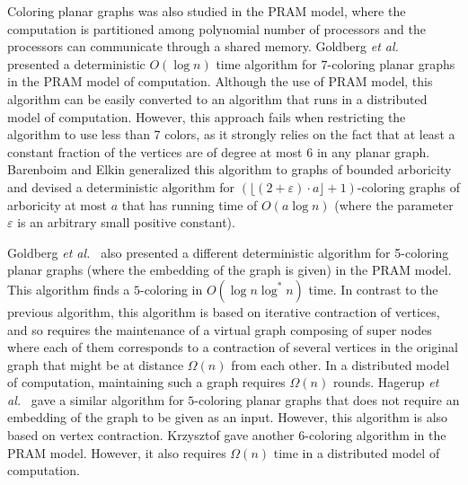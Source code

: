 \documentclass{article}
\theoremstyle{definition}
\newcommand{\etal}{{\em et al.\ }}
\begin{document}
Coloring planar graphs was also studied in the PRAM model, where the computation is partitioned among polynomial number of processors and the processors can communicate through a shared memory.
Goldberg \etal \cite{Goldberg87} presented a deterministic $O(\log{n})$ time algorithm for $7$-coloring planar graphs in the PRAM model of computation.
Although the use of PRAM model, this algorithm can be easily converted to an algorithm that runs in a distributed model of computation.
However, this approach fails when restricting the algorithm to use less than 7 colors, as it strongly relies on the fact that at least a constant fraction of the vertices are of degree at most 6 in any planar graph.
Barenboim and Elkin \cite{Barenboim08} generalized this algorithm to graphs of bounded arboricity and devised a deterministic algorithm for $\left(\lfloor (2 + \varepsilon) \cdot a \rfloor + 1\right)$-coloring graphs of arboricity at most $a$ that has running time of $O(a\log{n})$ (where the parameter $\varepsilon$ is an arbitrary small positive constant).


Goldberg \etal \cite{Goldberg87} also presented a different deterministic algorithm for 5-coloring planar graphs (where the embedding of the graph is given) in the PRAM model. This algorithm finds a $5$-coloring in $O(\log{n}\log^{*}{n})$ time. In contrast to the previous algorithm, this algorithm is based on iterative contraction of vertices, and so requires the maintenance of a virtual graph composing of super nodes where each of them corresponds to a contraction of several vertices in the original graph that might be at distance $\Omega(n)$ from each other. In a distributed model of computation, maintaining such a graph requires $\Omega(n)$ rounds.
Hagerup \etal \cite{Opt5} gave a similar algorithm for $5$-coloring planar graphs that does not require an embedding of the graph to be given as an input.
However, this algorithm is also based on vertex contraction.
Krzysztof  \cite{Krzysztof} gave another $6$-coloring algorithm in the PRAM model. However, it also requires $\Omega(n)$ time in a distributed model of computation.
\end{document}
